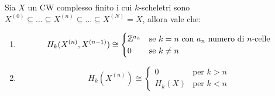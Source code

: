 \begin{lemma}
  Sia $ X $ un CW complesso finito i cui $ k $-scheletri sono $ X^{(0)} \subseteq  \dots \subseteq X^{(n)} \subseteq \dots \subseteq X^{(N)} = X $,
  allora vale che:
  \begin{enumerate}
  \item
    \[
      H_k(X^{(n)}, X^{(n-1)}) \cong
      \begin{cases}
        \mathbb{Z}^{a_n} & \text{se } k = n \text{ con $ a_n $ numero di $ n $-celle} \\
        0 & \text{se } k \not = n
      \end{cases}
    \]
  \item
    \[
      H_k(X^{(n)}) \cong
      \begin{cases}
        0 & \text{per } k > n \\
        H_k(X) & \text{per } k < n
      \end{cases}
    \]
  \end{enumerate}
\end{lemma}
